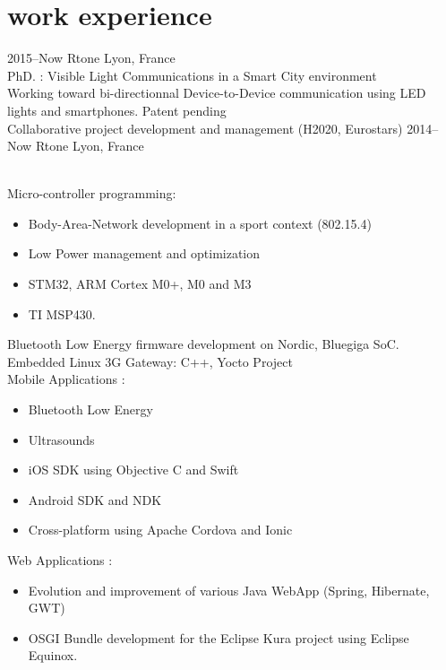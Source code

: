 \documentclass[]{cv-style}          %
\begin{document}
\section{work experience}

\begin{entrylist}
\entry
  {2015--Now}
  {Rtone}
  {Lyon, France}
  {\\
  PhD. : Visible Light Communications in a Smart City environment\\
  Working toward bi-directionnal Device-to-Device communication using LED lights and smartphones. Patent pending\\
  Collaborative project development and management (H2020, Eurostars) }
\entry
  {2014-- Now}
  {Rtone}
  {Lyon, France}
  {\\
  Micro-controller programming:
  \begin{itemize}
    \item Body-Area-Network development in a sport context (802.15.4)
    \item Low Power management and optimization
    \item STM32, ARM Cortex M0+, M0 and M3
    \item TI MSP430.
  \end{itemize}
  Bluetooth Low Energy firmware development on Nordic, Bluegiga SoC.\\
  Embedded Linux 3G Gateway: C++, Yocto Project\\
  Mobile Applications :
  \begin{itemize}
    \item Bluetooth Low Energy
    \item Ultrasounds
    \item iOS SDK using Objective C and Swift
    \item Android SDK and NDK
    \item Cross-platform using Apache Cordova and Ionic
  \end{itemize}
  Web Applications :
  \begin{itemize}
    \item Evolution and improvement of various Java WebApp (Spring, Hibernate, GWT)
    \item OSGI Bundle development for the Eclipse Kura project using Eclipse Equinox.
  \end{itemize}}

\end{entrylist}
\end{document}
